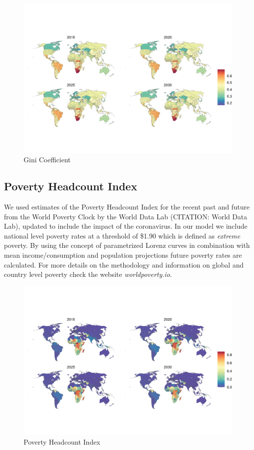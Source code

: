 \documentclass{article}
\begin{document}
\begin{figure}[H]
  \centering
  \includegraphics[width=\linewidth]{img/covars/gini.png}
  \caption{Gini Coefficient}
\end{figure}

\subsection{Poverty Headcount Index}
We used estimates of the Poverty Headcount Index for the recent past and future from the World Poverty Clock by the World Data Lab (CITATION: World Data Lab), updated to include the impact of the coronavirus. In our model we include national level poverty rates at a threshold of \$1.90 which is defined as \textit{extreme} poverty. By using the concept of parametrized Lorenz curves in combination with mean income/consumption and population projections future poverty rates are calculated. For more details on the methodology and information on global and country level poverty check the website \textit{worldpoverty.io}.

\begin{figure}[H]
  \centering
  \includegraphics[width=\linewidth]{img/covars/hci.png}
  \caption{Poverty Headcount Index}
\end{figure}
\end{document}
